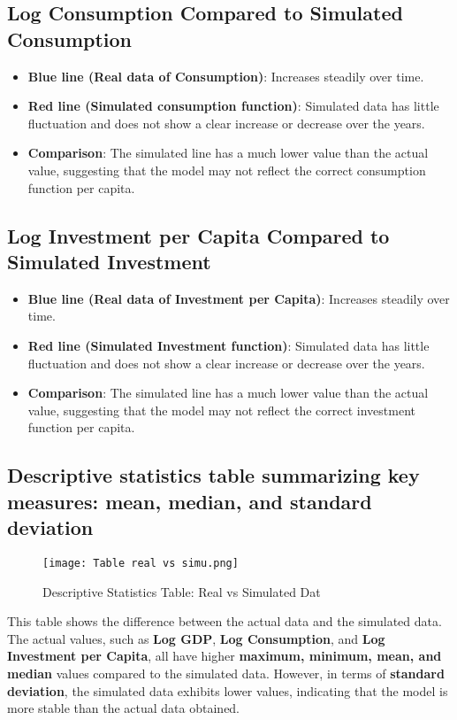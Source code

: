 \documentclass{article}
\begin{document}
\subsection*{Log Consumption Compared to Simulated Consumption}
\begin{itemize}
    \item \textbf{Blue line (Real data of Consumption)}: Increases steadily over time.
    \item \textbf{Red line (Simulated consumption function)}: Simulated data has little fluctuation and does not show a clear increase or decrease over the years.
    \item \textbf{Comparison}: The simulated line has a much lower value than the actual value, suggesting that the model may not reflect the correct consumption function per capita.
\end{itemize}

\subsection*{Log Investment per Capita Compared to Simulated Investment}
\begin{itemize}
    \item \textbf{Blue line (Real data of Investment per Capita)}: Increases steadily over time.
    \item \textbf{Red line (Simulated Investment function)}: Simulated data has little fluctuation and does not show a clear increase or decrease over the years.
    \item \textbf{Comparison}: The simulated line has a much lower value than the actual value, suggesting that the model may not reflect the correct investment function per capita.
\end{itemize}


\subsection*{Descriptive statistics table summarizing key measures: mean, median, and standard deviation}
\begin{figure}[H]
    \centering
    \texttt{[image: Table real vs simu.png]}
    \caption{Descriptive Statistics Table: Real vs Simulated Dat}
    \label{fig:gdp}
\end{figure}
This table shows the difference between the actual data and the simulated data. The actual values, such as \textbf{Log GDP}, \textbf{Log Consumption}, and \textbf{Log Investment per Capita}, all have higher \textbf{maximum, minimum, mean, and median} values compared to the simulated data. However, in terms of \textbf{standard deviation}, the simulated data exhibits lower values, indicating that the model is more stable than the actual data obtained.
\end{document}
